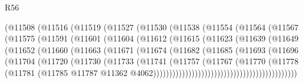 \begin{lexlean}{R56}
\begin{coremodule}
                  (@11508
                    (@11516
                      (@11519
                        (@11527
                          (@11530
                            (@11538
                              (@11554
                                (@11564
                                  (@11567
                                    (@11575
                                      (@11591
                                        (@11601
                                          (@11604
                                            (@11612
                                              (@11615
                                                (@11623
                                                  (@11639
                                                    (@11649
                                                      (@11652
                                                        (@11660
                                                          (@11663
                                                            (@11671
                                                              (@11674
                                                                (@11682
                                                                  (@11685
                                                                    (@11693
                                                                      (@11696
                                                                        (@11704
                                                                          (@11720
                                                                            (@11730
                                                                              (@11733
                                                                                (@11741
                                                                                  (@11757
                                                                                    (@11767
                                                                                      (@11770
                                                                                        (@11778
                                                                                          (@11781
                                                                                            (@11785
                                                                                              @11787
                                                                                              @11362
                                                                                              @4062)))))))))))))))))))))))))))))))))))))))))))))

\end{coremodule}
\end{lexlean}
